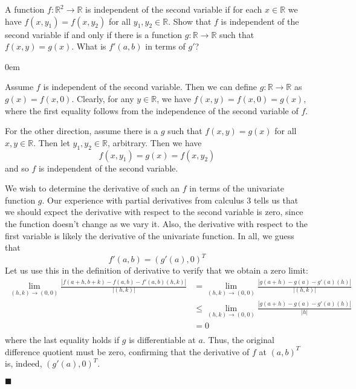 \documentclass[12pt]{article}
\renewcommand{\qed}{\hfill$\blacksquare$}
\renewenvironment{proof}{\begin{addmargin}[1em]{0em}\begin{newproof}}{\end{newproof}\end{addmargin}\qed}
\newenvironment{problem}[2][Problem]{\begin{trivlist}
\item[\hskip \labelsep {\bfseries #1}\hskip \labelsep {\bfseries #2.}]}{\end{trivlist}}
\begin{document}
\begin{problem}{2.2}
A function $f:\mathbb{R}^2\rightarrow \mathbb{R}$ is independent of the second variable if for each $x\in \mathbb{R}$ we have $f\left(x,y_1\right) = f\left(x,y_2\right)$ for all $y_1,y_2 \in \mathbb{R}$. Show that $f$ is independent of the second variable if and only if there is a function $g:\mathbb{R}\rightarrow \mathbb{R}$ such that $f\left(x,y\right) = g\left(x\right)$. What is $f'\left(a,b\right)$ in terms of $g'$?
\end{problem}

\begin{proof}
Assume $f$ is independent of the second variable. Then we can define $g:\mathbb{R}\rightarrow \mathbb{R}$ as $g\left(x\right) = f\left(x,0\right)$. Clearly, for any $y\in \mathbb{R}$, we have $f\left(x,y\right) = f\left(x,0\right) = g\left(x\right)$, where the first equality follows from the independence of the second variable of $f$.

For the other direction, assume there is a $g$ such that $f\left(x,y\right)=g\left(x\right)$ for all $x,y \in \mathbb{R}$. Then let $y_1, y_2 \in \mathbb{R}$, arbitrary. Then we have
$$ f\left(x,y_1\right) = g\left(x\right) = f\left(x,y_2\right) $$ and so $f$ is independent of the second variable.

We wish to determine the derivative of such an $f$ in terms of the univariate function $g$. Our experience with partial derivatives from calculus 3 tells us that we should expect the derivative with respect to the second variable is zero, since the function doesn't change as we vary it. Also, the derivative with respect to the first variable is likely the derivative of the univariate function. In all, we guess that
$$ f'\left(a,b\right) = \left(g'\left(a\right),0\right)^T $$ Let us use this in the definition of derivative to verify that we obtain a zero limit:
\begin{equation*} \begin{split}
\lim_{\left(h,k\right)\rightarrow \left(0,0\right)} \frac{\left| f\left(a+h,b+k\right)-f\left(a,b\right)-f'\left(a,b\right) \left(h,k\right)\right|}{\left| \left(h,k\right)\right|} & = \lim_{\left(h,k\right)\rightarrow \left(0,0\right)} \frac{\left| g\left(a+h\right) - g\left(a\right) - g'\left(a\right) \left(h\right)\right|}{\left|\left(h,k\right)\right|} \\
& \leq \lim_{\left(h,k\right)\rightarrow \left(0,0\right)} \frac{\left| g\left(a+h\right) - g\left(a\right) - g'\left(a\right) \left(h\right)\right|}{\left|h\right|} \\
& = 0 \\
\end{split}\end{equation*}
where the last equality holds if $g$ is differentiable at $a$. Thus, the original difference quotient must be zero, confirming that the derivative of $f$ at $\left(a,b\right)^T$ is, indeed, $\left(g'\left(a\right),0\right)^T$.
\end{proof}
\end{document}
